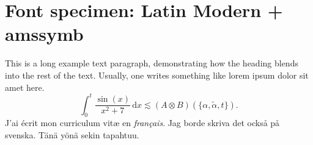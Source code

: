\documentclass[11pt]{report}
\begin{document}
\section*{Font specimen: Latin Modern + amssymb}
This is a long example text paragraph,
demonstrating how the heading blends into the rest of the text.
Usually, one writes something like lorem ipsum dolor sit amet here.
\[
\int_0^t \frac{\sin(x)}{x^2 + 7} \,\mathrm dx
\lesssim (A \otimes B)(\{ \alpha, \tilde\alpha, t \}).
\]
J'ai écrit mon curriculum vit\ae{} en \emph{fran\c{c}ais}.
Jag borde skriva det också på svenska.
Tänä yönä sekin tapahtuu.
\end{document}
